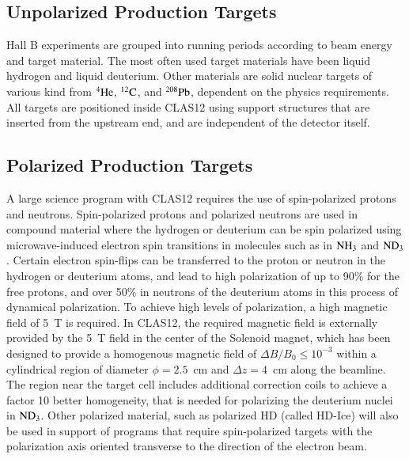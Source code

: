 \documentclass[final,3p,twocolumn]{elsarticle}
\begin{document}
\subsection{\rm Unpolarized Production Targets} 
Hall B experiments are grouped into running periods according to beam energy and target material. 
The most often used target materials have been liquid hydrogen and liquid deuterium. Other materials are solid nuclear targets of various kind from $\rm ^4He$, $\rm ^{12}C$, and $\rm ^{208}Pb$, dependent on the physics requirements. All targets are positioned 
 inside CLAS12 using support structures that are inserted from the upstream end, and are independent 
 of the detector itself. 
 \subsection{\rm Polarized Production Targets} 
 A large science program with CLAS12 requires the use of spin-polarized protons and neutrons. 
 Spin-polarized protons and polarized neutrons are used in compound material where the hydrogen or 
 deuterium can be spin polarized using microwave-induced electron spin transitions in molecules such as 
 in $\rm NH_3$ and $\rm ND_3$. Certain electron spin-flips can be transferred to the proton or neutron in the 
 hydrogen or deuterium atoms, and lead to high polarization of up to 90\% for the free protons, and 
 over 50\% in neutrons of the deuterium atoms in this process of dynamical polarization. To achieve 
 high levels of polarization, a high magnetic field of 5~T is required. In CLAS12, the required magnetic 
 field is externally 
 provided by the 5~T field in the center of the Solenoid magnet, which has been designed to provide 
 a homogenous magnetic field of $\Delta B / B_0 \leq 10^{-3}$ within a cylindrical region of diameter 
 $\phi = 2.5$~cm and $\Delta{z} = 4$~cm along the beamline.  The region near the target cell includes 
 additional correction coils to achieve a factor 10 better homogeneity, that is needed for polarizing 
 the deuterium nuclei in $\rm ND_3$. Other polarized material, such as polarized HD (called HD-Ice)  
will also be used in support of programs that require spin-polarized targets with the polarization axis 
oriented transverse to the direction of the electron beam.        
\end{document}
